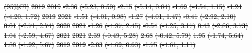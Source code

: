 \documentclass[
  letterpaper,
  DIV=11,
  numbers=noendperiod]{scrartcl}
\providecommand{\DIFdeltex}[1]{{\protect\color{red}\sout{#1}}}                      %
\providecommand{\DIFdelFL}[1]{\DIFdel{#1}} %
\providecommand{\DIFdel}[1]{\texorpdfstring{\DIFdeltex{#1}}{}} %
\begin{document}
\DIFdelFL{(95\%CI)}%
\DIFdelFL{\hspace{1em}2019 }%
\DIFdelFL{2019 }%
\DIFdelFL{-2.36 }%
\DIFdelFL{(-5.23, 0.50) }%
\DIFdelFL{-2.15 }%
\DIFdelFL{(-5.14, 0.84) }%
\DIFdelFL{-1.69 }%
\DIFdelFL{(-4.54, 1.15) }%
\DIFdelFL{-1.24 }%
\DIFdelFL{(-4.20, 1.72)}%
\DIFdelFL{\hspace{1em}2019 }%
\DIFdelFL{2021 }%
\DIFdelFL{-1.51 }%
\DIFdelFL{(-4.01, 0.98) }%
\DIFdelFL{-1.27 }%
\DIFdelFL{(-4.01, 1.47) }%
\DIFdelFL{-0.41 }%
\DIFdelFL{(-2.92, 2.10) }%
\DIFdelFL{0.01 }%
\DIFdelFL{(-2.71, 2.74)}%
\DIFdelFL{\hspace{1em}2020 }%
\DIFdelFL{2021 }%
\DIFdelFL{-1.26 }%
\DIFdelFL{(-4.97, 2.45) }%
\DIFdelFL{-0.54 }%
\DIFdelFL{(-4.25, 3.17) }%
\DIFdelFL{0.43 }%
\DIFdelFL{(-2.86, 3.73) }%
\DIFdelFL{1.04 }%
\DIFdelFL{(-2.59, 4.67)}%
\DIFdelFL{\hspace{1em}2021 }%
\DIFdelFL{2021 }%
\DIFdelFL{2.39 }%
\DIFdelFL{(-0.49, 5.28) }%
\DIFdelFL{2.68 }%
\DIFdelFL{(-0.42, 5.79) }%
\DIFdelFL{1.95 }%
\DIFdelFL{(-1.74, 5.64) }%
\DIFdelFL{1.88 }%
\DIFdelFL{(-1.92, 5.67)}%
\DIFdelFL{\hspace{1em}2019 }%
\DIFdelFL{2019 }%
\DIFdelFL{-2.03 }%
\DIFdelFL{(-4.69, 0.63) }%
\DIFdelFL{-1.75 }%
\DIFdelFL{(-4.61, 1.11) }%
\end{document}
